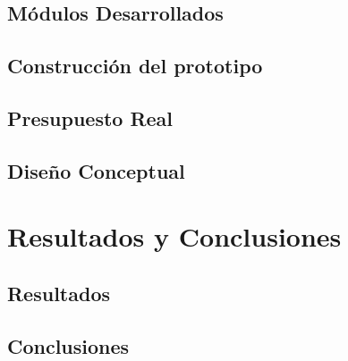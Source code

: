 \documentclass{extbook}
\begin{document}
  \section{Módulos Desarrollados}
  \section{Construcción del prototipo}
  \section{Presupuesto Real}
  \section{Diseño Conceptual}

\chapter{Resultados y Conclusiones}
  \section{Resultados}
  \section{Conclusiones}


\end{document}
